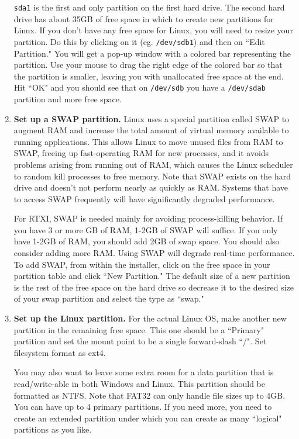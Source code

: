 \begin{enumerate}
\texttt{sda1} is the first and only partition on the first hard drive. The second hard drive has about 35GB of free space in which to create new partitions for Linux. If you don't have any free space for Linux, you will need to resize your partition. Do this by clicking on it (eg. \texttt{/dev/sdb1}) and then on ``Edit Partition." You will get a pop-up window with a colored bar representing the partition. Use your mouse to drag the right edge of the colored bar so that the partition is smaller, leaving you with unallocated free space at the end. Hit ``OK" and you should see that on \texttt{/dev/sdb} you have a \texttt{/dev/sdab} partition and more free space.

\item \textbf{Set up a SWAP partition.} Linux uses a special partition called SWAP to augment RAM and increase the total amount of virtual memory available to running applications. This allows Linux to move unused files from RAM to SWAP, freeing up fast-operating RAM for new processes, and it avoids problems arising from running out of RAM, which causes the Linux scheduler to random kill processes to free memory.  Note that SWAP exists on the hard drive and doesn't not perform nearly as quickly as RAM. Systems that have to access SWAP frequently will have significantly degraded performance. 

For RTXI, SWAP is needed mainly for avoiding process-killing behavior. If you have 3 or more GB of RAM, 1-2GB of SWAP will suffice. If you only have 1-2GB of RAM, you should add 2GB of swap space. You should also consider adding more RAM. Using SWAP will degrade real-time performance. To add SWAP, from within the installer, click on the free space in your partition table and click ``New Partition." The default size of a new partition is the rest of the free space on the hard drive so decrease it to the desired size of your swap partition and select the type as ``swap."

\item \textbf{Set up the Linux partition.} For the actual Linux OS, make another new partition in the remaining free space. This one should be a ``Primary" partition and set the mount point to be a single forward-slash ``/". Set filesystem format as ext4. 

You may also want to leave some extra room for a data partition that is read/write-able in both Windows and Linux. This partition should be formatted as NTFS. Note that FAT32 can only handle file sizes up to 4GB. You can have up to 4 primary partitions. If you need more, you need to create an extended partition under which you can create as many ``logical" partitions as you like.


\end{enumerate}
